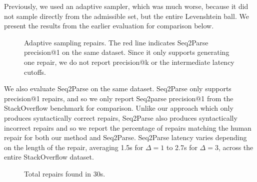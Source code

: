 \documentclass[sigplan,review,anonymous,acmsmall]{acmart}\settopmatter{printfolios=false,printccs=false,printacmref=false}
\begin{document}
  Previously, we used an adaptive sampler, which was much worse, because it did not sample directly from the admissible set, but the entire Levenshtein ball. We present the results from the earlier evaluation for comparison below.

  \begin{figure}[H]
    \resizebox{.24\textwidth}{!}{}
    \resizebox{.25\textwidth}{!}{}
    \resizebox{.24\textwidth}{!}{}
    \resizebox{.24\textwidth}{!}{}
    \caption{Adaptive sampling repairs. The red line indicates Seq2Parse precision@1 on the same dataset. Since it only supports generating one repair, we do not report precision@k or the intermediate latency cutoffs.}\label{fig:adaptive}
  \end{figure}

  We also evaluate Seq2Parse on the same dataset. Seq2Parse only supports precision@1 repairs, and so we only report Seq2parse precision@1 from the StackOverflow benchmark for comparison. Unlike our approach which only produces syntactically correct repairs, Seq2Parse also produces syntactically incorrect repairs and so we report the percentage of repairs matching the human repair for both our method and Seq2Parse. Seq2Parse latency varies depending on the length of the repair, averaging 1.5s for $\Delta=1$ to 2.7s for $\Delta=3$, across the entire StackOverflow dataset.


  \begin{wrapfigure}{r}{0.35\textwidth}
    \vspace{-10pt}
    \resizebox{.35\textwidth}{!}{}
    \caption{Total repairs found in 30s.}
    \label{fig:throughput}
    \vspace{-10pt}
  \end{wrapfigure}
\end{document}
